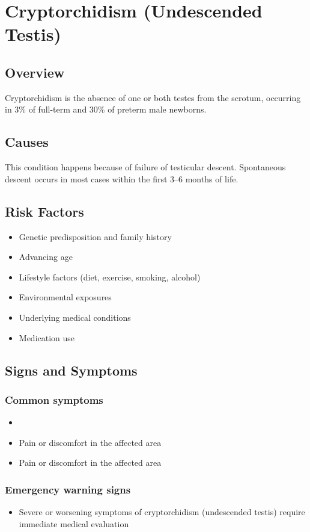 \chapter{Cryptorchidism (Undescended Testis)}
\label{sec:Cryptorchidism}

\section{Overview}
Cryptorchidism is the absence of one or both testes from the scrotum, occurring in 3\% of full-term and 30\% of preterm male newborns.
\section{Causes}
This condition happens because of failure of testicular descent. Spontaneous descent occurs in most cases within the first 3--6 months of life.     
\section{Risk Factors}

\begin{itemize}[noitemsep]
  \item Genetic predisposition and family history
  \item Advancing age
  \item Lifestyle factors (diet, exercise, smoking, alcohol)
  \item Environmental exposures
  \item Underlying medical conditions
  \item Medication use
\end{itemize}
\section{Signs and Symptoms}

\subsection{Common symptoms}
\begin{itemize}[noitemsep]
  \item \item Pain or discomfort in the affected area    \item Pain or discomfort in the affected area
  \end{itemize}

\subsection{Emergency warning signs}
\begin{itemize}[noitemsep]
  \item Severe or worsening symptoms of cryptorchidism (undescended testis) require immediate medical evaluation
\end{itemize}
